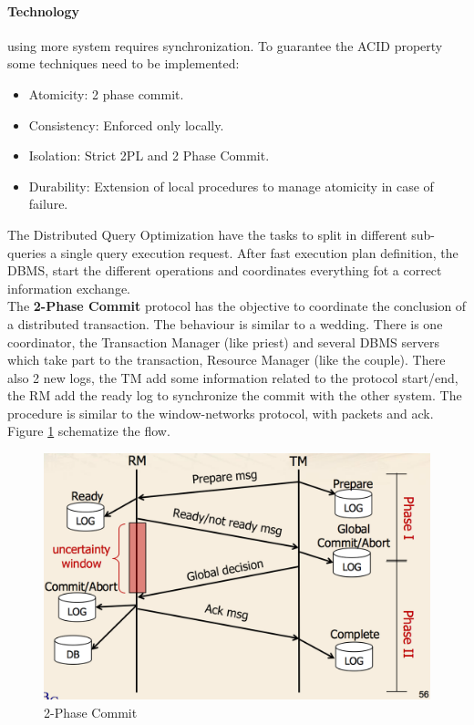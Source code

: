 \documentclass[12pt]{article}
\begin{document}
\paragraph{Technology} using more system requires synchronization. To guarantee the ACID property some techniques need to be implemented:
\begin{itemize}
  \item Atomicity: 2 phase commit.
  \item Consistency: Enforced only locally.
  \item Isolation: Strict 2PL and 2 Phase Commit.
  \item Durability: Extension of local procedures to manage atomicity in case of failure.
\end{itemize}
The Distributed Query Optimization have the tasks to split in different sub-queries a single query execution request. After fast execution plan definition, the DBMS, start the different operations and coordinates everything fot a correct information exchange.\\
The \textbf{2-Phase Commit} protocol has the objective to coordinate the conclusion of a distributed transaction. The behaviour is similar to a wedding. There is one coordinator, the Transaction Manager (like priest) and several DBMS servers which take part to the transaction, Resource Manager (like the couple). There also 2 new logs, the TM add some information related to the protocol start/end, the RM add the ready log to synchronize the commit with the other system. The procedure is similar to the window-networks protocol, with packets and ack. Figure \ref{fig:2pc} schematize the flow.

\begin{figure}[h!]
  \includegraphics[width=\linewidth]{images/2pc.png}
  \caption{2-Phase Commit}
  \label{fig:2pc}
\end{figure}
\end{document}
